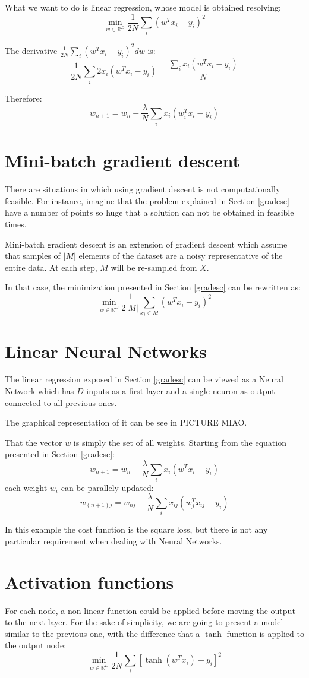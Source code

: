 What we want to do is linear regression, whose model is obtained resolving:
$$\displaystyle \min_{w \in \mathbb{R}^D} \frac{1}{2N} \sum_i (w^T x_i - y_i)^2$$

The derivative  $\frac{1}{2N} \sum_i (w^T x_i - y_i)^2 dw$ is:
$$\frac{1}{2N} \sum_i 2 x_i(w^T x_i - y_i) = \frac{\sum_i x_i(w^T x_i - y_i)}{N}$$

Therefore:
$$ w_{n+1} = w_n - \frac{\lambda}{N} \sum_i x_i(w_i^T x_i - y_i) $$


\section{Mini-batch gradient descent}
There are situations in which using gradient descent is not computationally feasible.
For instance, imagine that the problem explained in Section \ref{gradesc} have
a number of points so huge that a solution can not be obtained in feasible times.

Mini-batch gradient descent is an extension of gradient descent which assume that
samples of $|M|$ elements of the dataset are a noisy representative of the entire data.
At each step, $M$ will be re-sampled from $X$.

In that case, the minimization presented in Section \ref{gradesc} can be rewritten as:
$$\displaystyle \min_{w \in \mathbb{R}^D} \frac{1}{2|M|} \sum_{x_i \in M} (w^T x_i - y_i)^2 $$

\section{Linear Neural Networks}
The linear regression exposed in Section \ref{gradesc} can be viewed as a Neural Network
which has $D$ inputs as a first layer and a single neuron as output connected to all previous ones.

The graphical representation of it can be see in PICTURE MIAO.

That the vector $w$ is simply the set of all weights.
Starting from the equation presented in Section \ref{gradesc}:
$$ w_{n+1} = w_n - \frac{\lambda}{N} \sum_i x_i(w^T x_i - y_i) $$
each weight $w_i$ can be parallely updated:
$$ w_{(n+1)j} = w_{nj} -  \frac{\lambda}{N} \sum_i x_{ij}(w^T_j x_{ij} - y_i) $$

In this example the cost function is the square loss, but there is not any particular requirement when
dealing with Neural Networks.

\section{Activation functions}
For each node, a non-linear function could be applied before moving the output to the next layer.
For the sake of simplicity, we are going to present a model similar to the previous one,
with the difference that a $\tanh$ function is applied to the output node:
$$ \displaystyle \min_{w \in \mathbb{R}^D} \frac{1}{2N} \sum_i [\tanh(w^T x_i) - y_i]^2 $$

